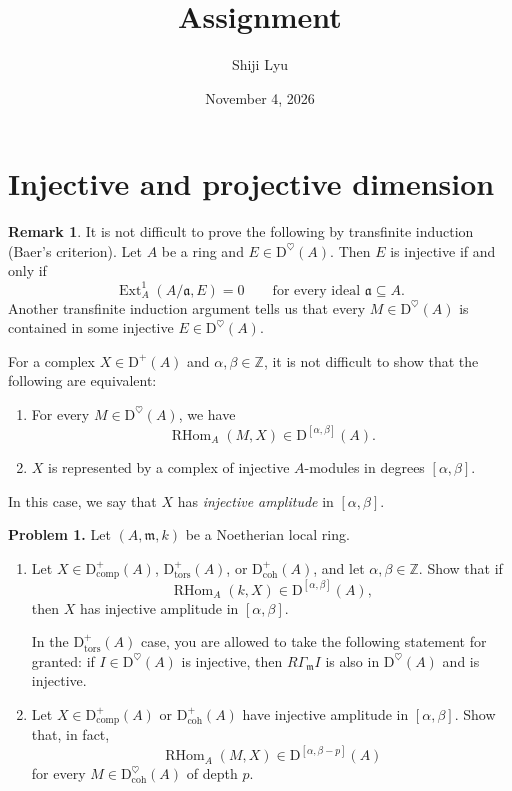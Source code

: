 \documentclass[11pt]{amsart}
\title{Assignment}
\date{November 4, 2026}
\author{Shiji Lyu}
\theoremstyle{definition}
\newtheorem{remark}[theorem]{Remark}
\newcommand{\RHom}{\operatorname{RHom}}
\newcommand{\D}{\mathrm{D}}
\newcommand{\Dcoh}{\D_{\mathrm{coh}}}
\newcommand{\m}{\mathfrak m}
\newcommand{\RGamma}{R\Gamma}
\newcommand{\Dcomp}{\D_{\mathrm{comp}}}
\newcommand{\Dtors}{\D_{\mathrm{tors}}}
\newcommand{\fa}{\mathfrak{a}}
\newcommand{\Ext}{\operatorname{Ext}}
\begin{document}
\maketitle

\section{Injective and projective dimension}

\begin{remark}
It is not difficult to prove the following by transfinite induction (Baer's criterion). Let $A$ be a ring and $E\in\D^\heartsuit(A)$. Then $E$ is injective if and only if
\[
\Ext_A^1(A/\fa,E)=0
\qquad\text{for every ideal }\fa\subseteq A.
\]
Another transfinite induction argument tells us that every $M\in\D^\heartsuit(A)$ is contained in some injective $E\in\D^\heartsuit(A)$.

For a complex $X\in\D^+(A)$ and $\alpha,\beta\in\mathbb Z$, it is not difficult to show that the following are equivalent:
\begin{enumerate}[label=(\arabic*)]
\item For every $M\in\D^\heartsuit(A)$, we have
\[
\RHom_A(M,X)\in\D^{[\alpha,\beta]}(A).
\]
\item $X$ is represented by a complex of injective $A$-modules in degrees $[\alpha,\beta]$.
\end{enumerate}
In this case, we say that $X$ has \emph{injective amplitude} in $[\alpha,\beta]$.
\end{remark}

\medskip
\noindent\textbf{Problem 1.}
Let $(A,\m,k)$ be a Noetherian local ring.
\begin{enumerate}[label=(\arabic*)]
\item Let $X\in\Dcomp^+(A)$, $\Dtors^+(A)$, or $\Dcoh^+(A)$, and let $\alpha,\beta\in\mathbb Z$. Show that if
\[
\RHom_A(k,X)\in\D^{[\alpha,\beta]}(A),
\]
then $X$ has injective amplitude in $[\alpha,\beta]$.

In the $\Dtors^+(A)$ case, you are allowed to take the following statement for granted: if $I\in\D^\heartsuit(A)$ is injective, then $\RGamma_{\m}I$ is also in $\D^\heartsuit(A)$ and is injective.

\item Let $X\in\Dcomp^+(A)$ or $\Dcoh^+(A)$ have injective amplitude in $[\alpha,\beta]$. Show that, in fact,
\[
\RHom_A(M,X)\in\D^{[\alpha,\beta-p]}(A)
\]
for every $M\in\Dcoh^\heartsuit(A)$ of depth $p$.
\end{enumerate}
\end{document}
